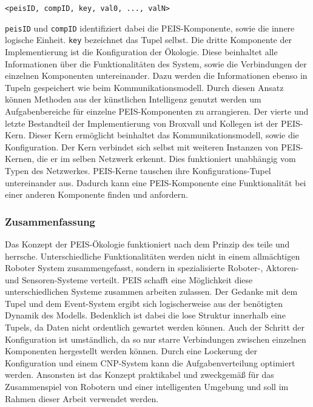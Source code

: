 {\tt <peisID, compID, key, val0, ..., valN>}

{\tt peisID} und {\tt compID} identifiziert dabei die PEIS-Komponente, sowie die innere logische Einheit. {\tt key} bezeichnet das Tupel selbst. Die dritte Komponente der Implementierung ist die Konfiguration der Ökologie. Diese beinhaltet alle Informationen über die Funktionalitäten des System, sowie die Verbindungen der einzelnen Komponenten untereinander. Dazu werden die Informationen ebenso in Tupeln gespeichert wie beim Kommunikationsmodell. Durch diesen Ansatz können Methoden aus der künstlichen Intelligenz genutzt werden um Aufgabenbereiche für einzelne PEIS-Komponenten zu arrangieren.\cite{lundh2005can} Der vierte und letzte Bestandteil der Implementierung von Broxvall und Kollegen ist der PEIS-Kern. Dieser Kern ermöglicht beinhaltet das Kommunikationsmodell, sowie die Konfiguration. Der Kern verbindet sich selbst mit weiteren Instanzen von PEIS-Kernen, die er im selben Netzwerk erkennt. Dies funktioniert unabhängig vom Typen des Netzwerkes. PEIS-Kerne tauschen ihre Konfigurations-Tupel untereinander aus. Dadurch kann eine PEIS-Komponente eine Funktionalität bei einer anderen Komponente finden und anfordern.\cite{Saffiotti:2005:PEA:1107548.1107615}

\subsubsection{Zusammenfassung}
Das Konzept der PEIS-Ökologie funktioniert nach dem Prinzip des teile und herrsche. Unterschiedliche Funktionalitäten werden nicht in einem allmächtigen Roboter System zusammengefasst, sondern in spezialisierte Roboter-, Aktoren- und Sensoren-Systeme verteilt. PEIS schafft eine Möglichkeit diese unterschiedlichen Systeme zusammen arbeiten zulassen. Der Gedanke mit dem Tupel und dem Event-System ergibt sich logischerweise aus der benötigten Dynamik des Modells. Bedenklich ist dabei die lose Struktur innerhalb eine Tupels, da Daten nicht ordentlich gewartet werden können. Auch der Schritt der Konfiguration ist umständlich, da so nur starre Verbindungen zwischen einzelnen Komponenten hergestellt werden können. Durch eine Lockerung der Konfiguration und einem CNP-System kann die Aufgabenverteilung optimiert werden. Ansonsten ist das Konzept praktikabel und zweckgemäß für das Zusammenspiel von Robotern und einer intelligenten Umgebung und soll im Rahmen dieser Arbeit verwendet werden.

